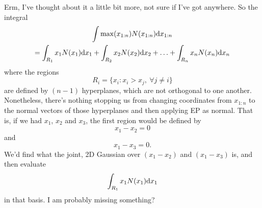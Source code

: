 \documentclass[a4paper,10pt]{article}
\title{}
\author{}
\begin{document}
\maketitle

\begin{abstract}

\end{abstract}

\section{}

Erm, I've thought about it a little bit more, not sure if I've got
anywhere. So the integral
\begin{multline*}
 \int \max(x_{1:n}) N(x_{1:n}) \mathrm{d} x_{1:n} \\
= \int_{R_1} x_1 N(x_1) \mathrm{d} x_1 + \int_{R_2} x_2 N(x_2) \mathrm{d} x_2 + \ldots +
\int_{R_n} x_n N(x_n) \mathrm{d} x_n
\end{multline*}
where the regions
$$R_i = \{x_i: x_i > x_j,\ \forall j \neq i \}$$
are defined by $(n-1)$ hyperplanes, which are not orthogonal to one
another. Nonetheless, there's nothing stopping us from changing
coordinates from $x_{1:n}$ to the normal vectors of those hyperplanes
and then applying EP as normal. That is, if we had $x_1$, $x_2$ and $x_3$,
the first region would be defined by $$x_1 - x_2 = 0$$ and $$x_1 - x_3 = 0.$$
We'd find what the joint, 2D Gaussian over $(x_1 - x_2)$ and $(x_1 - x_3)$
is, and then evaluate  $$\int_{R_1} x_1 N(x_1) \mathrm{d} x_1$$ in that basis. I am
probably missing something?

% 
\end{document}
